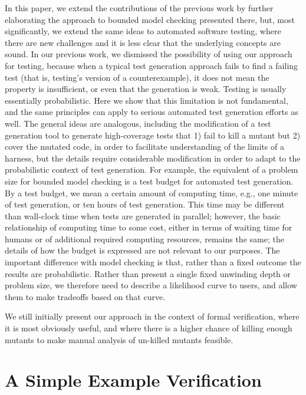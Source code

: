 \documentclass{svjour3}
\begin{document}
In this paper, we extend the contributions of the previous work by
further elaborating the approach to bounded model checking presented
there, but, most significantly, we extend the same ideas to automated
software testing, where there are new challenges and it is less clear
that the underlying concepts are sound.  In our previous work, we
dismissed the possibility of using our approach for testing, because
when a typical test generation approach fails to find a failing test
(that is, testing's version of a counterexample), it does not mean the
property is insufficient, or even that the generation is weak.
Testing is usually essentially probabilistic.  Here we show that this
limitation is not fundamental, and the same principles can apply to
serious automated test generation efforts as well.  The general ideas
are analogous, including the modification of a test generation tool to
generate high-coverage tests that 1) fail to kill a mutant but 2)
cover the mutated code, in order to facilitate understanding of the
limits of a harness, but the details require considerable modification
in order to adapt to the probabilistic context of test generation.
For example, the equivalent of a problem size for bounded model
checking is a test budget for automated test generation.   By a test
budget, we mean a certain amount of computing time, e.g., one minute
of test generation, or ten hours of test generation.  This time may be
different than wall-clock time when tests are generated in parallel;
however, the basic relationship of computing time to some cost, either
in terms of waiting time for humans or of additional required
computing resources, remains the same; the details of how the budget
is expressed are not relevant to our purposes.  The important
difference with model checking is that,
rather than a fixed outcome the results are probabilistic.  Rather
than present a single fixed unwinding depth or problem size,  we
therefore need to describe a
likelihood curve to users, and allow them to make tradeoffs based on
that curve.

We still initially present our approach in the context of formal
verification, where it is most obviously useful, and where there is a
higher chance of killing enough mutants to make manual analysis of
un-killed mutants feasible.

\section{A Simple Example Verification}
\end{document}
